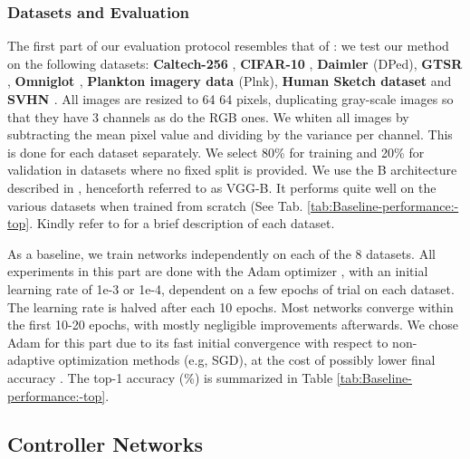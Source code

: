 \documentclass[10pt,journal,compsoc]{IEEEtran}
\begin{document}
\subsubsection{Datasets and Evaluation\label{subsec:Datasets-and-Evaluation}}

The first part of our evaluation protocol resembles that of \cite{1701.07275}:
we test our method on the following datasets: \textbf{Caltech-256
}\cite{griffin2007caltech},\textbf{ CIFAR-10} \cite{krizhevsky2009learning},
\textbf{Daimler \cite{munder2006experimental}} (DPed), \textbf{GTSR}
\cite{stallkamp2012man}, \textbf{Omniglot \cite{mnih2015human}},
\textbf{Plankton imagery data \cite{cowen2015planktonset}} ({\small{}Plnk}),
\textbf{Human Sketch dataset} \cite{eitz2012humans} and \textbf{SVHN
\cite{netzer2011reading}}. All images are resized to 64 \texttimes{}
64 pixels, duplicating gray-scale images so that they have 3 channels
as do the RGB ones. We whiten all images by subtracting the mean pixel
value and dividing by the variance per channel. This is done for each
dataset separately. We select 80\% for training and 20\% for validation
in datasets where no fixed split is provided. We use the B architecture
described in \cite{simonyan2014very}, henceforth referred to as VGG-B.
It performs quite well on the various datasets when trained from scratch
(See Tab. \ref{tab:Baseline-performance:-top}. Kindly refer to \cite{1701.07275}
for a brief description of each dataset.

As a baseline, we train networks independently on each of the 8 datasets.
All experiments in this part are done with the Adam optimizer \cite{kingma2014adam},
with an initial learning rate of 1e-3 or 1e-4, dependent on a few
epochs of trial on each dataset. The learning rate is halved after
each 10 epochs. Most networks converge within the first 10-20 epochs,
with mostly negligible improvements afterwards. We chose Adam for
this part due to its fast initial convergence with respect to non-adaptive
optimization methods (e.g, SGD), at the cost of possibly lower final
accuracy \cite{journals/corr/WilsonRSSR17}. The top-1 accuracy (\%)
is summarized in Table \ref{tab:Baseline-performance:-top}.

\subsection{Controller Networks\label{subsec:Control-Networks}}
\end{document}
